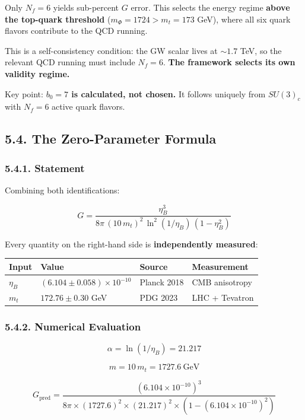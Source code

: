 \documentclass[
  11pt,
]{article}
\begin{document}
Only \(N_f = 6\) yields sub-percent \(G\) error. This selects the energy
regime \textbf{above the top-quark threshold}
(\(m_\Phi = 1724 > m_t = 173\) GeV), where all six quark flavors
contribute to the QCD running.

This is a self-consistency condition: the GW scalar lives at
\(\sim 1.7\) TeV, so the relevant QCD running must include \(N_f = 6\).
\textbf{The framework selects its own validity regime.}

Key point: \textbf{\(b_0 = 7\) is calculated, not chosen.} It follows
uniquely from \(SU(3)_c\) with \(N_f = 6\) active quark flavors.

\bigskip

\hypertarget{the-zero-parameter-formula}{%
\subsection{5.4. The Zero-Parameter
Formula}\label{the-zero-parameter-formula}}

\hypertarget{statement}{%
\subsubsection{5.4.1. Statement}\label{statement}}

Combining both identifications:

\[\boxed{G = \frac{\eta_B^3}{8\pi\,(10\,m_t)^2\,\ln^2(1/\eta_B)\,(1 - \eta_B^2)}} \tag{232}\]

Every quantity on the right-hand side is \textbf{independently
measured}:

\begin{longtable}[]{@{}llll@{}}
\toprule
Input & Value & Source & Measurement\tabularnewline
\midrule
\endhead
\(\eta_B\) & \((6.104 \pm 0.058) \times 10^{-10}\) & Planck 2018 & CMB
anisotropy\tabularnewline
\(m_t\) & \(172.76 \pm 0.30\) GeV & PDG 2023 & LHC +
Tevatron\tabularnewline
\bottomrule
\end{longtable}

\hypertarget{numerical-evaluation-2}{%
\subsubsection{5.4.2. Numerical
Evaluation}\label{numerical-evaluation-2}}

\[\alpha = \ln(1/\eta_B) = 21.217 \tag{233}\]

\[m = 10\,m_t = 1727.6~\text{GeV} \tag{234}\]

\[G_{\text{pred}} = \frac{(6.104 \times 10^{-10})^3}{8\pi \times (1727.6)^2 \times (21.217)^2 \times (1 - (6.104\times10^{-10})^2)} \tag{235}\]
\end{document}

